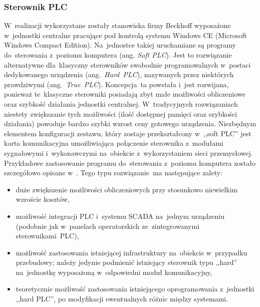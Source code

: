 \subsubsection{Sterownik PLC}
W~realizacji wykorzystane zostały stanowiska firmy Beckhoff wyposażone w~jednostki centralne pracujące pod kontrolą systemu Windows CE (Microsoft Windows Compact Edition). Na~jednostce takiej uruchamiane są programy do~sterowania z~poziomu komputera (ang. \textit{Soft PLC}). Jest to rozwiązanie alternatywne dla~klasyczny sterowników swobodnie programowalnych w~postaci dedykowanego urządzenia (ang.~\textit{Hard~PLC}), nazywanych przez niektórych prawdziwymi (ang.~\textit{True~PLC}).
Koncepcja~ta powstała i~jest rozwijana, ponieważ te~klasyczne sterowniki posiadają zbyt małe możliwości obliczeniowe oraz szybkość działania jednostki centralnej. W~tradycyjnych rozwiązaniach niestety zwiększanie tych możliwości (ilość dostępnej pamięci oraz szybkości działania) powoduje bardzo szybki wzrost ceny gotowego urządzenia.
Niezbędnym elementem konfiguracji zestawu, który zostaje przekształcony w~,,soft PLC'' jest karta komunikacyjna umożliwiająca połączenie sterownika z~modułami sygnałowymi i~wykonawczymi na~obiekcie z~wykorzystaniem sieci przemysłowej.
Przykładowe zastosowanie programu do~sterowania z~poziomu komputera zostało szczegółowo opisane w~\cite{art_softPLC}.
Tego typu rozwiązanie~ma następujące zalety:
\begin{itemize}
\item duże zwiększenie możliwości obliczeniowych przy stosunkowo niewielkim wzroście kosztów,
\item możliwość integracji PLC i~systemu SCADA na~jednym urządzeniu (podobnie jak w~panelach operatorskich ze~zintegrowanymi sterownikami~PLC),
\item możliwość zastosowania istniejącej infrastruktury na~obiekcie w~przypadku przebudowy; należy jedynie podmienić istniejący sterownik typu ,,hard'' na~jednostkę wyposażoną w~odpowiedni moduł komunikacyjny,
\item teoretycznie możliwość zastosowania istniejącego oprogramowania z~jednostki ,,hard PLC'', po modyfikacji ewentualnych różnic między systemami.
\end{itemize}

